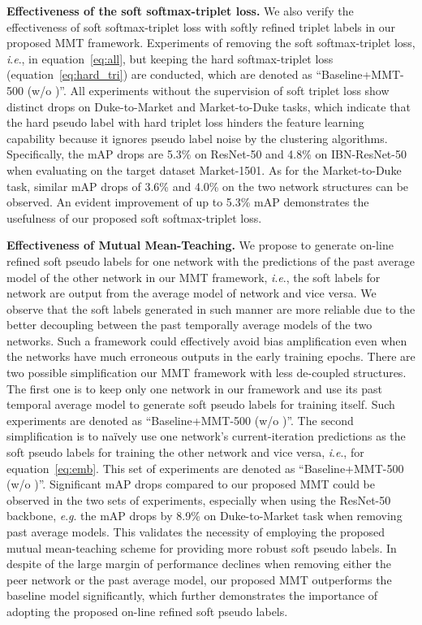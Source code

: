 \documentclass{article} \usepackage{iclr2020_conference,times}
\def\eqref#1{equation~\ref{#1}}
\newcommand{\ie}{\textit{i}.\textit{e}., }
\newcommand{\eg}{\textit{e}.\textit{g}. }
\begin{document}
\noindent\textbf{Effectiveness of the soft softmax-triplet loss.}
We also verify the effectiveness of soft softmax-triplet loss with softly refined triplet labels in our proposed MMT framework.
Experiments of removing the soft softmax-triplet loss, \ie  in \eqref{eq:all}, but keeping the hard softmax-triplet loss (\eqref{eq:hard_tri}) are conducted, which are denoted as ``Baseline+MMT-500 (w/o )''.
All experiments without the supervision of soft triplet loss show distinct drops on Duke-to-Market and Market-to-Duke tasks, which indicate that the hard pseudo label with hard triplet loss hinders the feature learning capability because it ignores pseudo label noise by the clustering algorithms.
Specifically, 
the mAP drops are 5.3\% on ResNet-50 and 4.8\% on IBN-ResNet-50 when evaluating on the target dataset Market-1501.
As for the Market-to-Duke task, similar mAP drops of 3.6\% and 4.0\% on the two network structures can be observed.
An evident improvement of up to 5.3\% mAP demonstrates the usefulness of our proposed soft softmax-triplet loss.

\noindent\textbf{Effectiveness of Mutual Mean-Teaching.}
We propose to generate on-line refined soft pseudo labels for one network with the predictions of the past average model of the other network in our MMT framework, \ie the soft labels for network  are output from the average model of network  and vice versa.
{We observe that the soft labels generated in such manner are more reliable due to the better decoupling between the past temporally average models of the two networks.}
Such a framework could effectively avoid bias amplification even when the networks have much erroneous outputs in the early training epochs. 
There are two possible simplification our MMT framework {with less de-coupled structures}. The first one is to keep only one network in our framework and use its past temporal average model to generate soft pseudo labels for training itself. Such experiments are denoted as ``Baseline+MMT-500 (w/o )''. 
The second simplification is to na\"ively use one network's current-iteration predictions as the soft pseudo labels for training the other network and vice versa, \ie  for \eqref{eq:emb}. This set of experiments are denoted as ``Baseline+MMT-500 (w/o )''.
Significant mAP drops compared to our proposed MMT could be observed in the two sets of experiments, especially when using the ResNet-50 backbone, \eg the mAP drops by 8.9\% on Duke-to-Market task when removing past average models.
This validates the necessity of employing the proposed mutual mean-teaching scheme for providing more robust soft pseudo labels.
In despite of the large margin of performance declines when removing either the peer network or the past average model,
our proposed MMT outperforms the baseline model significantly,
which further demonstrates the importance of adopting the proposed on-line refined soft pseudo labels.
\end{document}
